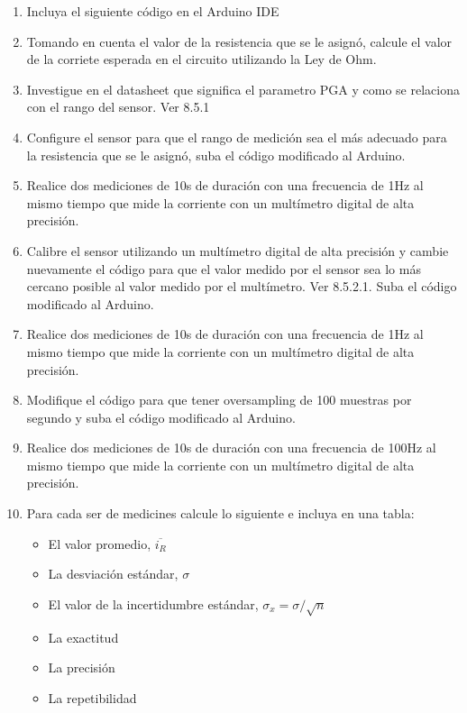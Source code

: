 \begin{enumerate}
    \item Incluya el siguiente código en el Arduino IDE
    {\scriptsize 
        
    }

    \item Tomando en cuenta el valor de la resistencia que se le asignó, calcule el valor de la corriete esperada en el circuito utilizando la Ley de Ohm.
    \item Investigue en el datasheet que significa el parametro PGA y como se relaciona con el rango del sensor. Ver 8.5.1
    \item Configure el sensor para que el rango de medición sea el más adecuado para la resistencia que se le asignó, suba el código modificado al Arduino.
    \item Realice dos mediciones de 10s de duración con una frecuencia de 1Hz al mismo tiempo que mide la corriente con un multímetro digital de alta precisión.
    \item Calibre el sensor utilizando un multímetro digital de alta precisión y cambie nuevamente el código para que el valor medido por el sensor sea lo más cercano posible al valor medido por el multímetro. Ver 8.5.2.1. Suba el código modificado al Arduino.
    \item Realice dos mediciones de 10s de duración con una frecuencia de 1Hz al mismo tiempo que mide la corriente con un multímetro digital de alta precisión.
    \item Modifique el código para que tener oversampling de 100 muestras por segundo y suba el código modificado al Arduino.
    \item Realice dos mediciones de 10s de duración con una frecuencia de 100Hz al mismo tiempo que mide la corriente con un multímetro digital de alta precisión.
    \item Para cada ser de medicines calcule lo siguiente e incluya en una tabla:
        \begin{itemize}
            \item El valor promedio, $\overline{i_R}$ 
            \item La desviación estándar, $\sigma$
            \item El valor de la incertidumbre estándar, $\sigma_x = \sigma / \sqrt{n}$
            \item La exactitud
            \item La precisión
            \item La repetibilidad
        \end{itemize}
        

\end{enumerate}
